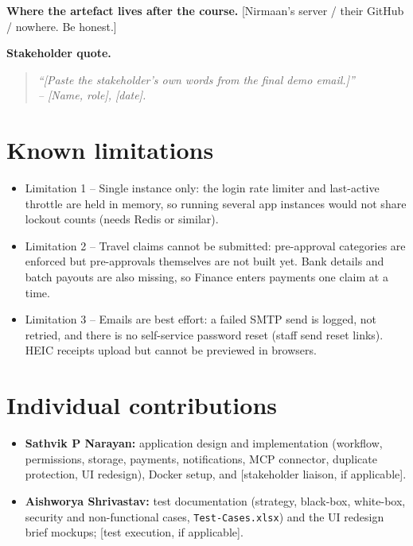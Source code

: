 \documentclass[11pt,a4paper]{article}
\begin{document}
\textbf{Where the artefact lives after the course.}
[Nirmaan's server / their GitHub / nowhere. Be honest.]

\textbf{Stakeholder quote.}
\begin{quote}\textit{``[Paste the stakeholder's own words from the final demo email.]''\\
-- [Name, role], [date].}\end{quote}

\section{Known limitations}

\begin{itemize}[leftmargin=*,nosep]
    \item Limitation 1 -- Single instance only: the login rate limiter and last-active throttle are held in memory, so running several app instances would not share lockout counts (needs Redis or similar).
    \item Limitation 2 -- Travel claims cannot be submitted: pre-approval categories are enforced but pre-approvals themselves are not built yet. Bank details and batch payouts are also missing, so Finance enters payments one claim at a time.
    \item Limitation 3 -- Emails are best effort: a failed SMTP send is logged, not retried, and there is no self-service password reset (staff send reset links). HEIC receipts upload but cannot be previewed in browsers.
\end{itemize}

\section{Individual contributions}

\begin{itemize}[leftmargin=*,nosep]
    \item \textbf{Sathvik P Narayan:} application design and implementation (workflow, permissions, storage, payments, notifications, MCP connector, duplicate protection, UI redesign), Docker setup, and [stakeholder liaison, if applicable].
    \item \textbf{Aishworya Shrivastav:} test documentation (strategy, black-box, white-box, security and non-functional cases, \texttt{Test-Cases.xlsx}) and the UI redesign brief mockups; [test execution, if applicable].
\end{itemize}
\end{document}
